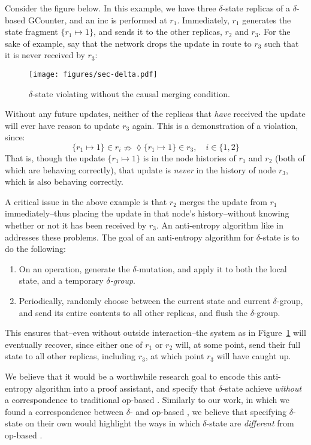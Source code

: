 Consider the figure below. In this example, we have three $\delta$-state \CRDT
replicas of a $\delta$-based GCounter, and an \textsf{inc} is performed at
$r_1$. Immediately, $r_1$ generates the state fragment $\{ r_1 \mapsto 1 \}$,
and sends it to the other replicas, $r_2$ and $r_3$. For the sake of example,
say that the network drops the update in route to $r_3$ such that it is never
received by $r_3$:

\begin{figure}[H]
  \centering
  \texttt{[image: figures/sec-delta.pdf]}
  \caption{$\delta$-state \CRDTs violating \SEC without the causal merging
    condition.}
  \label{fig:delta-sec-violation}
\end{figure}

Without any future updates, neither of the replicas that \emph{have} received
the update will ever have reason to update $r_3$ again. This is a demonstration
of a \SEC violation, since:
\[
  \{ r_1 \mapsto 1 \} \in r_i \nRightarrow \lozenge \{ r_1 \mapsto 1 \} \in r_3,
  \quad i \in \{ 1, 2 \}
\]
That is, though the update $\{ r_1 \mapsto 1 \}$ is in the node histories of
$r_1$ and $r_2$ (both of which are behaving correctly), that update is
\emph{never} in the history of node $r_3$, which is also behaving correctly.

A critical issue in the above example is that $r_2$ merges the update from $r_1$
immediately--thus placing the update in that node's history--without knowing
whether or not it has been received by $r_3$. An anti-entropy algorithm like
in~\citep{almedia18} addresses these problems. The goal of an anti-entropy
algorithm for $\delta$-state \CRDTs is to do the following:
\begin{enumerate}
  \item On an operation, generate the $\delta$-mutation, and apply it to both
    the local state, and a temporary \emph{$\delta$-group}.
  \item Periodically, randomly choose between the current state and current
    $\delta$-group, and send its entire contents to all other replicas, and
    flush the $\delta$-group.
\end{enumerate}
This ensures that--even without outside interaction--the system as in
Figure~\ref{fig:delta-sec-violation} will eventually recover, since either one
of $r_1$ or $r_2$ will, at some point, send their full state to all other
replicas, including $r_3$, at which point $r_3$ will have caught up.

We believe that it would be a worthwhile research goal to encode this
anti-entropy algorithm into a proof assistant, and specify that $\delta$-state
\CRDTs achieve \SEC \emph{without} a correspondence to traditional op-based
\CRDTs. Similarly to our work, in which we found a correspondence between
$\delta$- and op-based \CRDTs, we believe that specifying $\delta$-state \CRDTs
on their own would highlight the ways in which $\delta$-state \CRDTs are
\emph{different} from op-based \CRDTs.

